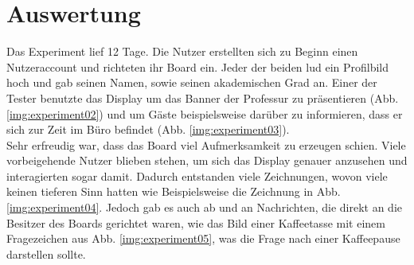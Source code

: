 \section{Auswertung}\label{Auswertung}
Das Experiment lief 12 Tage. Die Nutzer erstellten sich zu Beginn einen Nutzeraccount und richteten ihr Board ein. Jeder der beiden lud ein Profilbild hoch und gab seinen Namen, sowie seinen akademischen Grad an.
Einer der Tester benutzte das Display um das Banner der Professur zu präsentieren (Abb. \ref{img:experiment02}) und um Gäste beispielsweise darüber zu informieren, dass er sich zur Zeit im Büro befindet (Abb. \ref{img:experiment03}).\\
Sehr erfreudig war, dass das Board viel Aufmerksamkeit zu erzeugen schien. Viele vorbeigehende Nutzer blieben stehen, um sich das Display genauer anzusehen und interagierten sogar damit. Dadurch entstanden viele Zeichnungen, wovon viele keinen tieferen Sinn hatten wie Beispielsweise die Zeichnung in Abb. \ref{img:experiment04}. Jedoch gab es auch ab und an Nachrichten, die direkt an die Besitzer des Boards gerichtet waren, wie das Bild einer Kaffeetasse mit einem Fragezeichen aus Abb. \ref{img:experiment05}, was die Frage nach einer Kaffeepause darstellen sollte.
